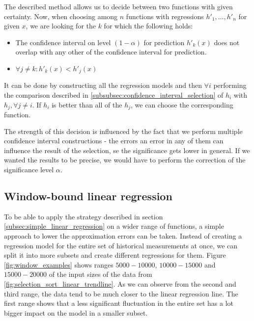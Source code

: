 The described method allows us to decide between two functions with given certainty. Now, when choosing among $n$ functions with regressions $h'_1, ..., h'_n$ for given $x$, we are looking for the $k$ for which the following holds:

\begin{itemize}
	\item The confidence interval on level $(1-\alpha)$ for prediction $h'_k(x)$ does not overlap with any other of the confidence interval for prediction.
	\item $\forall j \ne k: h'_k(x) < h'_j(x)$
\end{itemize}

It can be done by constructing all the regression models and then $\forall i$ performing the comparison described in \ref{subsubsec:confidence_interval_selection} of $h_i$ with $h_j, \forall j \ne i$. If $h_i$ is better than all of the $h_j$, we can choose the corresponding function.

The strength of this decision is influenced by the fact that we perform multiple confidence interval constructions - the errors an error in any of them can influence the result of the selection, se the significance gets lower in general. If we wanted the results to be precise, we would have to perform the correction of the significance level $\alpha$.


\subsection{Window-bound linear regression}
\label{subsec:window_bound_regression}

To be able to apply the strategy described in section \ref{subsec:simple_linear_regression} on a wider range of functions, a simple approach to lower the approximation errors can be taken. Instead of creating a regression model for the entire set of historical measurements at once, we can split it into more subsets and create different regressions for them. Figure \ref{fig:window_examples} shows ranges $5000 - 10000$, $10000-15000$ and $15000-20000$ of the input sizes of the data from \ref{fig:selection_sort_linear_trendline}. As we can observe from the second and third range, the data tend to be much closer to the linear regression line. The first range shows that a less significant fluctuation in the entire set has a lot bigger impact on the model in a smaller subset.

